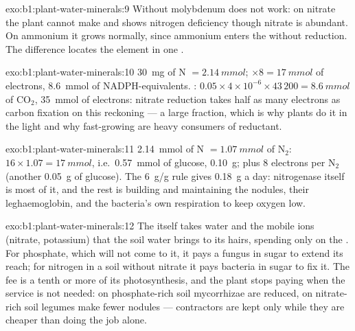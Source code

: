 \begin{solution}{exo:b1:plant-water-minerals:9}
Without molybdenum  does not work: on nitrate the
plant cannot make  and shows nitrogen deficiency though
nitrate is abundant. On ammonium it grows normally, since ammonium
enters the  without reduction. The difference locates the
element in one .
\end{solution}

\begin{solution}{exo:b1:plant-water-minerals:10}
\qty{30}{mg} of N $= \qty{2.14}{mmol}$; $\times 8 = \qty{17}{mmol}$ of
electrons, \qty{8.6}{mmol} of NADPH-equivalents. : $0.05\times
4\times 10^{-6}\times 43\,200 = \qty{8.6}{mmol}$ of $\mathrm{CO_2}$,
\qty{35}{mmol} of electrons: nitrate reduction takes half as many
electrons as carbon fixation on this reckoning --- a large fraction,
which is why plants do it in the light and why fast-growing 
are heavy consumers of reductant.
\end{solution}

\begin{solution}{exo:b1:plant-water-minerals:11}
\qty{2.14}{mmol} of N $= \qty{1.07}{mmol}$ of $\mathrm{N_2}$: 
$16\times 1.07 = \qty{17}{mmol}$, i.e.\ \qty{0.57}{mmol} of glucose,
\qty{0.10}{g}; plus 8 electrons per $\mathrm{N_2}$ (another
\qty{0.05}{g} of glucose). The \qty{6}{g/g} rule gives \qty{0.18}{g} a
day: nitrogenase itself is most of it, and the rest is building and
maintaining the nodules, their leghaemoglobin, and the bacteria's own
respiration to keep oxygen low.
\end{solution}

\begin{solution}{exo:b1:plant-water-minerals:12}
The  itself takes water and the mobile ions (nitrate, potassium)
that the soil water brings to its hairs, spending  only on the
. For phosphate, which will not come to it, it pays a
fungus in sugar to extend its reach; for nitrogen in a soil without
nitrate it pays bacteria in sugar to fix it. The fee is a tenth or
more of its photosynthesis, and the plant stops paying when the
service is not needed: on phosphate-rich soil mycorrhizae are reduced,
on nitrate-rich soil legumes make fewer nodules --- contractors are
kept only while they are cheaper than doing the job alone.
\end{solution}


